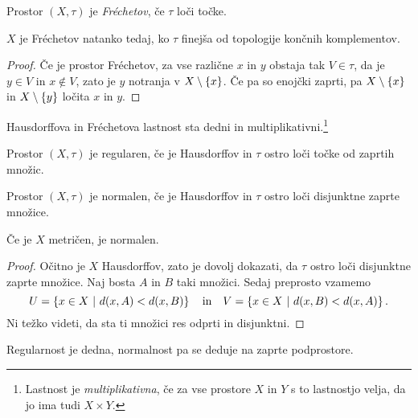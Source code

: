 \begin{definicija}
Prostor $(X, \tau)$ je
\emph{Fréchetov}, če $\tau$
loči točke.
\end{definicija}

\begin{trditev}
$X$ je Fréchetov natanko tedaj, ko $\tau$ finejša od topologije
končnih komplementov.
\end{trditev}

\begin{proof}
Če je prostor Fréchetov, za vse različne $x$ in $y$ obstaja tak
$V \in \tau$, da je $y \in V$ in $x \notin V$, zato je $y$
notranja v $X \setminus \left\{x\right\}$. Če pa so enojčki zaprti, pa
$X \setminus \left\{x\right\}$ in $X \setminus \left\{y\right\}$ ločita $x$ in $y$.
\end{proof}

\begin{trditev}
Hausdorffova in Fréchetova lastnost sta dedni in
multiplikativni.\footnote{Lastnost je \emph{multiplikativna}, če za
vse prostore $X$ in $Y$ s to lastnostjo velja, da jo ima tudi
$X \times Y$.}
\end{trditev}

\obvs

\begin{definicija}
Prostor $(X, \tau)$ je regularen, če je Hausdorffov in $\tau$ ostro
loči točke od zaprtih množic.
\end{definicija}

\begin{definicija}
Prostor $(X, \tau)$ je normalen, če je Hausdorffov in $\tau$ ostro
loči disjunktne zaprte množice.
\end{definicija}


\begin{izrek}
Če je $X$ metričen, je normalen.
\end{izrek}

\begin{proof}
Očitno je $X$ Hausdorffov, zato je dovolj dokazati, da $\tau$ ostro
loči disjunktne zaprte množice. Naj bosta $A$ in $B$ taki množici.
Sedaj preprosto vzamemo
\[
U = \left\{x \in X~\middle\vert~d(x,A) < d(x,B)\right\}
\quad \text{in} \quad
V = \left\{x \in X~\middle\vert~d(x,B) < d(x,A)\right\}.
\]
Ni težko videti, da sta ti množici res odprti in disjunktni.
\end{proof}

\begin{trditev}
Regularnost je dedna, normalnost pa se deduje na zaprte
podprostore.
\end{trditev}

